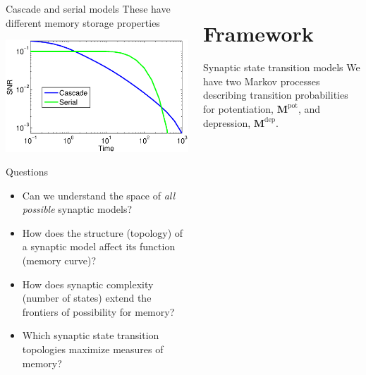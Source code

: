 \documentclass[final,hyperref={pdfpagelabels=false,bookmarks=false}]{beamer}
\newcommand{\pot}{^\text{pot}}
\newcommand{\dep}{^\text{dep}}
\newcommand{\M}{\mathbf{M}}
\begin{document}
\begin{frame}{}
\begin{columns}[t]
\begin{column}{0.26\linewidth}
\begin{block}{Cascade and serial models}
 These have different memory storage properties
 \begin{center}
 \includegraphics[width=0.5\linewidth]{cascms.eps}
 \end{center}
%
\end{block}



\begin{block}{Questions}
%
 \begin{itemize}
   \item Can we understand the space of \emph{all possible} synaptic models?
   \item How does the structure (topology) of a synaptic model affect its function (memory curve)?
   \item How does synaptic complexity (number of states) extend the frontiers of possibility for memory?
   \item Which synaptic state transition topologies maximize measures of memory?
 \end{itemize}
%
\end{block}


\end{column}

\begin{column}{0.415\linewidth}

\section{Framework}


\begin{block}{Synaptic state transition models}
%
%
 We have two Markov processes describing transition probabilities for potentiation, $\M\pot$, and depression, $\M\dep$.


\end{block}
\end{column}
\end{columns}
\end{frame}
\end{document}
